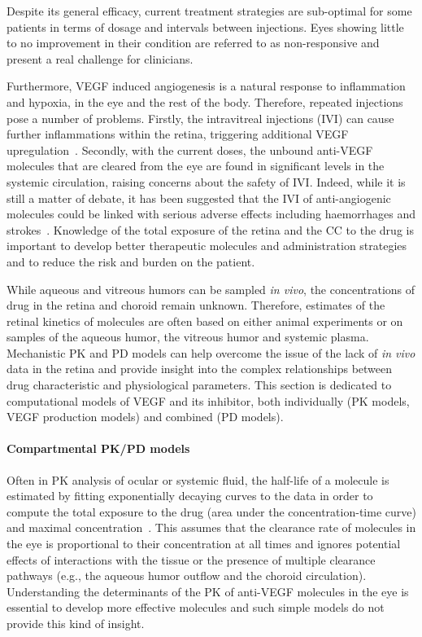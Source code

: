 \documentclass{article}
\begin{document}
Despite its general efficacy, current treatment strategies are sub-optimal for some patients in terms of dosage and intervals between injections.
Eyes showing little to no improvement in their condition are referred to as non-responsive and present a real challenge for clinicians.

Furthermore, VEGF induced angiogenesis is a natural response to inflammation and hypoxia, in the eye and the rest of the body. 
Therefore, repeated injections pose a number of problems.
Firstly, the intravitreal injections (IVI) can cause further inflammations within the retina, triggering additional VEGF upregulation~\cite{Iyer_2022}.
Secondly, with the current doses, the unbound anti-VEGF molecules that are cleared from the eye are found in significant levels in the systemic circulation, raising concerns about the safety of IVI.
Indeed, while it is still a matter of debate, it has been suggested that the IVI of anti-angiogenic molecules could be linked with serious adverse effects including haemorrhages and strokes~\cite{Avery_2016, Kaiser_2019, Maloney_2021}.
Knowledge of the total exposure of the retina and the CC to the drug is important to develop better therapeutic molecules and administration strategies and to reduce the risk and burden on the patient.

While aqueous and vitreous humors can be sampled \textit{in vivo}, the concentrations of drug in the retina and choroid remain unknown. 
Therefore, estimates of the retinal kinetics of molecules are often based on either animal experiments or on samples of the aqueous humor, the vitreous humor and systemic plasma.
Mechanistic PK and PD models can help overcome the issue of the lack of \textit{in vivo} data in the retina and provide insight into the complex relationships between drug characteristic and physiological parameters.
This section is dedicated to computational models of VEGF and its inhibitor, both individually (PK models, VEGF production models) and combined (PD models).

\paragraph*{Compartmental PK/PD models}

Often in PK analysis of ocular or systemic fluid, the half-life of a molecule is estimated by fitting exponentially decaying curves to the data in order to compute the total exposure to the drug (area under the concentration-time curve) and maximal concentration~\cite{Bakri_2007, Kaiser_2019, Park_2015, Park_2016, Xu_2013}.
This assumes that the clearance rate of molecules in the eye is proportional to their concentration at all times and ignores potential effects of interactions with the tissue or the presence of multiple clearance pathways (e.g., the aqueous humor outflow and the choroid circulation).
Understanding the determinants of the PK of anti-VEGF molecules in the eye is essential to develop more effective molecules and such simple models do not provide this kind of insight.
\end{document}
